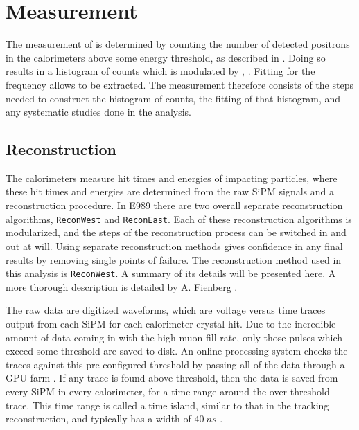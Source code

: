 
\thispagestyle{myheadings}

\graphicspath{{Body/Figures/WaGeneral/Reconstruction/}{Body/Figures/WaGeneral/Histogramming/}{Body/Figures/RatioAnalysis/}{Body/Figures/RatioAnalysis/MethodOverview/}}

\chapter{\texorpdfstring{\wa}{wa} Measurement}
\label{chapter:wa}


The measurement of \wa is determined by counting the number of detected positrons in the calorimeters above some energy threshold, as described in . Doing so results in a histogram of counts which is modulated by \wa, . Fitting for the frequency allows \wa to be extracted. The \wa measurement therefore consists of the steps needed to construct the histogram of counts, the fitting of that histogram, and any systematic studies done in the analysis.


\section{Reconstruction}
\label{sec:ReconWest}


The calorimeters measure hit times and energies of impacting particles, where these hit times and energies are determined from the raw SiPM signals and a reconstruction procedure. In E989 there are two overall separate reconstruction algorithms, \texttt{ReconWest} and \texttt{ReconEast}. Each of these reconstruction algorithms is modularized, and the steps of the reconstruction process can be switched in and out at will. Using separate reconstruction methods gives confidence in any final results by removing single points of failure. The reconstruction method used in this analysis is \texttt{ReconWest}. A summary of its details will be presented here. A more thorough description is detailed by A. Fienberg \cite{AFThesis}.


The raw data are digitized waveforms, which are voltage versus time traces output from each SiPM for each calorimeter crystal hit. Due to the incredible amount of data coming in with the high muon fill rate, only those pulses which exceed some threshold are saved to disk. An online processing system checks the traces against this pre-configured threshold by passing all of the data through a GPU farm \cite{Gohn:2016shi}. If any trace is found above threshold, then the data is saved from every SiPM in every calorimeter, for a time range around the over-threshold trace. This time range is called a time island, similar to that in the tracking reconstruction, and typically has a width of $\SI{40}{ns}$ \cite{AFThesis}.


